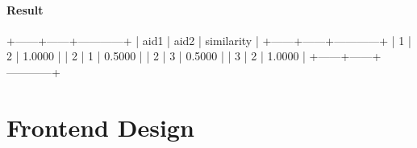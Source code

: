 \documentclass[letterpaper, 12pt]{report}
\begin{document}
	\subsubsection{Result}
	\begin{spverbatim}
		+------+------+------------+
		| aid1 | aid2 | similarity |
		+------+------+------------+
		|    1 |    2 | 1.0000     |
		|    2 |    1 | 0.5000     |
		|    2 |    3 | 0.5000     |
		|    3 |    2 | 1.0000     |
		+------+------+------------+
	\end{spverbatim}
	
	\chapter{Frontend Design}
	
\end{document}
